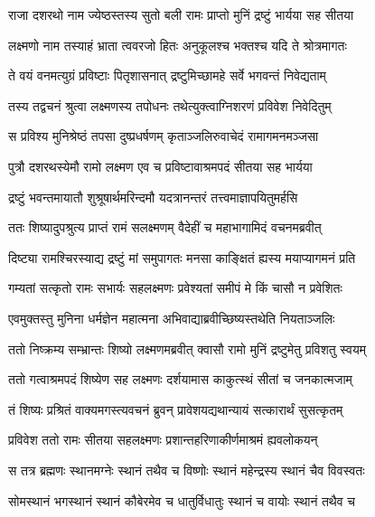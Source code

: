 \twolineshloka
{राजा दशरथो नाम ज्येष्ठस्तस्य सुतो बली}
{रामः प्राप्तो मुनिं द्रष्टुं भार्यया सह सीतया} %

\twolineshloka
{लक्ष्मणो नाम तस्याहं भ्राता त्ववरजो हितः}
{अनुकूलश्च भक्तश्च यदि ते श्रोत्रमागतः} %

\twolineshloka
{ते वयं वनमत्युग्रं प्रविष्टाः पितृशासनात्}
{द्रष्टुमिच्छामहे सर्वे भगवन्तं निवेद्यताम्} %

\twolineshloka
{तस्य तद्वचनं श्रुत्वा लक्ष्मणस्य तपोधनः}
{तथेत्युक्त्वाग्निशरणं प्रविवेश निवेदितुम्} %

\twolineshloka
{स प्रविश्य मुनिश्रेष्ठं तपसा दुष्प्रधर्षणम्}
{कृताञ्जलिरुवाचेदं रामागमनमञ्जसा} %

\twolineshloka
{पुत्रौ दशरथस्येमौ रामो लक्ष्मण एव च}
{प्रविष्टावाश्रमपदं सीतया सह भार्यया} %

\twolineshloka
{द्रष्टुं भवन्तमायातौ शुश्रूषार्थमरिन्दमौ}
{यदत्रानन्तरं तत्त्वमाज्ञापयितुमर्हसि} %

\twolineshloka
{ततः शिष्यादुपश्रुत्य प्राप्तं रामं सलक्ष्मणम्}
{वैदेहीं च महाभागामिदं वचनमब्रवीत्} %

\twolineshloka
{दिष्ट्या रामश्चिरस्याद्य द्रष्टुं मां समुपागतः}
{मनसा काङ्क्षितं ह्यस्य मयाप्यागमनं प्रति} %

\twolineshloka
{गम्यतां सत्कृतो रामः सभार्यः सहलक्ष्मणः}
{प्रवेश्यतां समीपं मे किं चासौ न प्रवेशितः} %

\twolineshloka
{एवमुक्तस्तु मुनिना धर्मज्ञेन महात्मना}
{अभिवाद्याब्रवीच्छिष्यस्तथेति नियताञ्जलिः} %

\twolineshloka
{ततो निष्क्रम्य सम्भ्रान्तः शिष्यो लक्ष्मणमब्रवीत्}
{क्वासौ रामो मुनिं द्रष्टुमेतु प्रविशतु स्वयम्} %

\twolineshloka
{ततो गत्वाश्रमपदं शिष्येण सह लक्ष्मणः}
{दर्शयामास काकुत्स्थं सीतां च जनकात्मजाम्} %

\twolineshloka
{तं शिष्यः प्रश्रितं वाक्यमगस्त्यवचनं ब्रुवन्}
{प्रावेशयद्यथान्यायं सत्कारार्थं सुसत्कृतम्} %

\twolineshloka
{प्रविवेश ततो रामः सीतया सहलक्ष्मणः}
{प्रशान्तहरिणाकीर्णमाश्रमं ह्यवलोकयन्} %

\twolineshloka
{स तत्र ब्रह्मणः स्थानमग्नेः स्थानं तथैव च}
{विष्णोः स्थानं महेन्द्रस्य स्थानं चैव विवस्वतः} %

\twolineshloka
{सोमस्थानं भगस्थानं स्थानं कौबेरमेव च}
{धातुर्विधातुः स्थानं च वायोः स्थानं तथैव च} %

